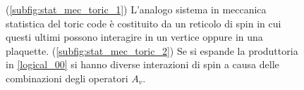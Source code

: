 \begin{figure}[!ht]
	\centering	
	 \quad
	\caption{(\ref{subfig:stat_mec_toric_1}) L'analogo sistema in meccanica statistica del toric code è costituito da un reticolo di spin in cui questi ultimi possono interagire in un vertice oppure in una plaquette. (\ref{subfig:stat_mec_toric_2}) Se si espande la produttoria in \eqref{logical_00} si hanno diverse interazioni di spin a causa delle combinazioni degli operatori $A_v$.}
    \label{fig:stat_mec_toric}
\end{figure}

